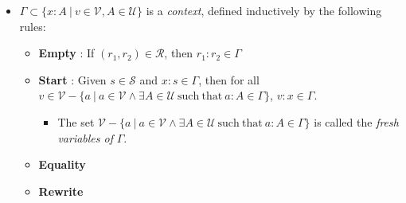 \begin{definition}
\begin{itemize}
        \item $\Gamma \subset \{x : A\ |\ v\in\mathcal{V},A \in \mathcal{U}\}$ is a \emph{context}, defined inductively by the following rules:
            \begin{itemize}
                \item \textbf{Empty} : If $(r_1,r_2)\in\mathcal{R}$, then $r_1 : r_2 \in \Gamma$
                \item \textbf{Start} : Given $s\in\mathcal{S}$ and $x : s \in \Gamma$, then for all $v \in \mathcal{V} - \{a\ |\ a \in \mathcal{V} \land \exists A\in\mathcal{U} \ \mathrm{such \ that\ } a : A \in \Gamma \}$, $v : x \in \Gamma$.
                \begin{itemize}
                    \item The set $\mathcal{V} - \{a\ |\ a \in \mathcal{V} \land \exists A\in\mathcal{U} \ \mathrm{such \ that\ } a : A \in \Gamma \}$ is called the \emph{fresh variables of} $\Gamma$. 
                \end{itemize}
                \item \textbf{Equality}
                \item \textbf{Rewrite}
            \end{itemize}
        

\end{itemize}
\end{definition}
